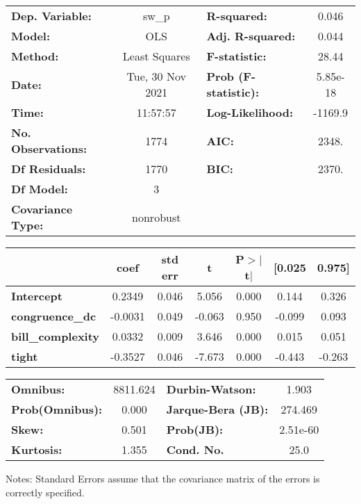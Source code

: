 \begin{center}
\begin{tabular}{lclc}
\toprule
\textbf{Dep. Variable:}    &      sw\_p       & \textbf{  R-squared:         } &     0.046   \\
\textbf{Model:}            &       OLS        & \textbf{  Adj. R-squared:    } &     0.044   \\
\textbf{Method:}           &  Least Squares   & \textbf{  F-statistic:       } &     28.44   \\
\textbf{Date:}             & Tue, 30 Nov 2021 & \textbf{  Prob (F-statistic):} &  5.85e-18   \\
\textbf{Time:}             &     11:57:57     & \textbf{  Log-Likelihood:    } &   -1169.9   \\
\textbf{No. Observations:} &        1774      & \textbf{  AIC:               } &     2348.   \\
\textbf{Df Residuals:}     &        1770      & \textbf{  BIC:               } &     2370.   \\
\textbf{Df Model:}         &           3      & \textbf{                     } &             \\
\textbf{Covariance Type:}  &    nonrobust     & \textbf{                     } &             \\
\bottomrule
\end{tabular}
\begin{tabular}{lcccccc}
                          & \textbf{coef} & \textbf{std err} & \textbf{t} & \textbf{P$> |$t$|$} & \textbf{[0.025} & \textbf{0.975]}  \\
\midrule
\textbf{Intercept}        &       0.2349  &        0.046     &     5.056  &         0.000        &        0.144    &        0.326     \\
\textbf{congruence\_dc}   &      -0.0031  &        0.049     &    -0.063  &         0.950        &       -0.099    &        0.093     \\
\textbf{bill\_complexity} &       0.0332  &        0.009     &     3.646  &         0.000        &        0.015    &        0.051     \\
\textbf{tight}            &      -0.3527  &        0.046     &    -7.673  &         0.000        &       -0.443    &       -0.263     \\
\bottomrule
\end{tabular}
\begin{tabular}{lclc}
\textbf{Omnibus:}       & 8811.624 & \textbf{  Durbin-Watson:     } &    1.903  \\
\textbf{Prob(Omnibus):} &   0.000  & \textbf{  Jarque-Bera (JB):  } &  274.469  \\
\textbf{Skew:}          &   0.501  & \textbf{  Prob(JB):          } & 2.51e-60  \\
\textbf{Kurtosis:}      &   1.355  & \textbf{  Cond. No.          } &     25.0  \\
\bottomrule
\end{tabular}
\end{center}

Notes: \newline
 [1] Standard Errors assume that the covariance matrix of the errors is correctly specified.